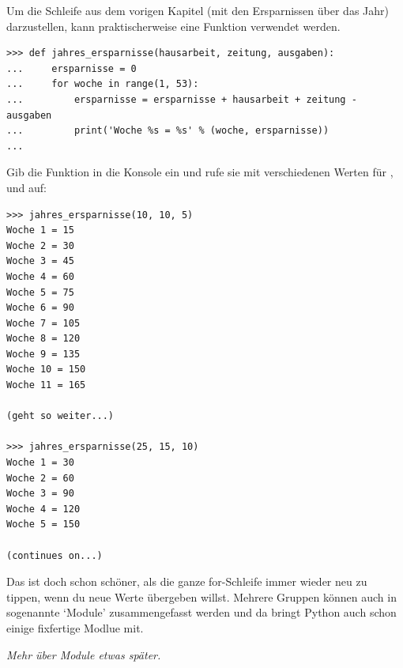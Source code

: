 Um die Schleife aus dem vorigen Kapitel (mit den Ersparnissen über das Jahr) darzustellen, kann praktischerweise eine Funktion verwendet werden.

\begin{Verbatim}[frame=single]
>>> def jahres_ersparnisse(hausarbeit, zeitung, ausgaben):
...     ersparnisse = 0
...     for woche in range(1, 53):
...         ersparnisse = ersparnisse + hausarbeit + zeitung - ausgaben
...         print('Woche %s = %s' % (woche, ersparnisse))
...
\end{Verbatim}

Gib die Funktion in die Konsole ein und rufe sie mit verschiedenen Werten für ,  und  auf:




\begin{Verbatim}[frame=single, label=Ausgabe]
>>> jahres_ersparnisse(10, 10, 5)
Woche 1 = 15
Woche 2 = 30
Woche 3 = 45
Woche 4 = 60
Woche 5 = 75
Woche 6 = 90
Woche 7 = 105
Woche 8 = 120
Woche 9 = 135
Woche 10 = 150
Woche 11 = 165

(geht so weiter...)

>>> jahres_ersparnisse(25, 15, 10)
Woche 1 = 30
Woche 2 = 60
Woche 3 = 90
Woche 4 = 120
Woche 5 = 150

(continues on...)
\end{Verbatim}

Das ist doch schon schöner, als die ganze for-Schleife immer wieder neu zu tippen, wenn du neue Werte übergeben willst. Mehrere Gruppen können auch in sogenannte `Module' zusammengefasst werden und da bringt Python auch schon einige fixfertige Modlue mit.
\par
\noindent
\emph{Mehr über Module etwas später.}

